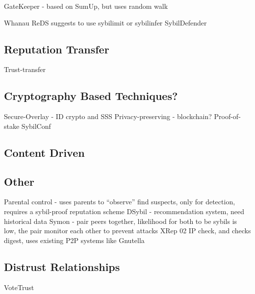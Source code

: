 GateKeeper\cite{tran2011optimal} - based on SumUp, but uses random walk

Whanau\cite{lesniewski2010whanau}
ReDS\cite{akavipat2014reds} suggests to use sybilimit or sybilinfer
SybilDefender\cite{wei2012sybildefender}


\subsection{Reputation Transfer}
Trust-transfer\cite{seigneur2005trust}

\subsection{Cryptography Based Techniques?}
Secure-Overlay\cite{lua2007securing} - ID crypto and SSS
Privacy-preserving\cite{schaub2016trustless} - blockchain?
Proof-of-stake\cite{dennis2016rep}
SybilConf\cite{tegeler2010sybilconf}

\subsection{Content Driven}
\cite{chatterjee2008robust}

\subsection{Other}
Parental control\cite{tehale2012parental} - uses parents to ``observe'' find suspects, only for detection, requires a sybil-proof reputation scheme
DSybil\cite{yu2009dsybil} - recommendation system, need historical data
Symon\cite{jyothi2009symon} - pair peers together, likelihood for both to be sybils is low, the pair monitor each other to prevent attacks
XRep 02\cite{damiani2002reputation} IP check, and checks digest, uses existing P2P systems like Gnutella

\subsection{Distrust Relationships}
VoteTrust\cite{xue2013votetrust}


